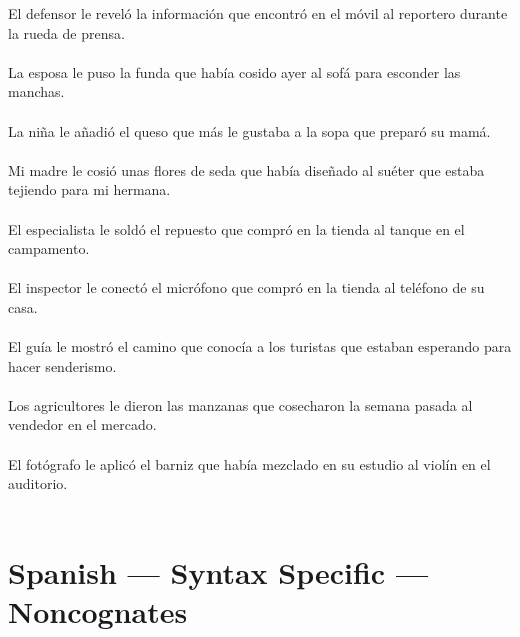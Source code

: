 El defensor le revel\'{o} la informaci\'{o}n que encontr\'{o} en el m\'{o}vil al reportero durante la rueda de prensa.	\\	\\
La esposa le puso la funda que hab\'{i}a cosido ayer  al sof\'{a} para esconder las manchas.	\\	\\
La ni\~{n}a le a\~{n}adi\'{o} el queso que m\'{a}s le gustaba a la sopa que prepar\'{o} su mam\'{a}.	\\	\\
Mi madre le cosi\'{o} unas flores de seda que hab\'{i}a dise\~{n}ado al suéter que estaba tejiendo para mi hermana.	\\	\\
El especialista le sold\'{o} el repuesto que compr\'{o} en la tienda al tanque en el campamento.	\\	\\
El inspector le conect\'{o} el micr\'{o}fono que compr\'{o} en la tienda al teléfono de su casa.	\\	\\
El gu\'{i}a le mostr\'{o} el camino que conoc\'{i}a a los turistas que estaban esperando para hacer senderismo.	\\	\\
Los agricultores le dieron las manzanas que cosecharon la semana pasada al vendedor en el mercado.	\\	\\
El fot\'{o}grafo le aplic\'{o} el barniz que hab\'{i}a mezclado en su estudio al viol\'{i}n en el auditorio.	\\	\\

\section{Spanish --- Syntax Specific --- Noncognates}

